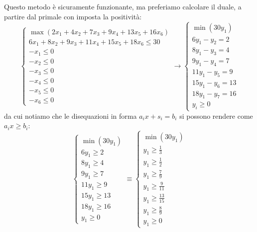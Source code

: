 \documentclass[a4paper,11pt]{article}
\begin{document}
Questo metodo è sicuramente funzionante, ma preferiamo calcolare il duale, a partire dal primale con imposta la positività:
\[
	\begin{cases}
		\max \left( 2x_1 + 4x_2 + 7x_3 + 9x_4 + 13x_5 + 16x_6 \right) \\ 
		6x_1 + 8x_2 + 9x_3 + 11x_4 + 15x_5 + 18x_6 \leq 30 \\
		-x_1 \leq 0 \\ 
		-x_2 \leq 0 \\ 
		-x_3 \leq 0 \\ 
		-x_4 \leq 0 \\ 
		-x_5 \leq 0 \\ 
		-x_6 \leq 0
	\end{cases}
	\rightarrow 
	\begin{cases}
		\min \left( 30y_1 \right) \\ 
		6 y_1 - y_2 = 2 \\
		8 y_1 - y_3 = 4 \\ 
		9 y_1 - y_4 = 7 \\ 
		11 y_1 - y_5 = 9 \\ 
		15 y_1 - y_6 = 13 \\ 
		18 y_1 - y_7 = 16 \\ 
		y_i \geq 0
	\end{cases}
\]
da cui notiamo che le disequazioni in forma $a_i x + s_i = b_i$ si possono rendere come $a_i x \geq b_i$: 
\[
	\begin{cases}
		\min \left( 30y_1 \right) \\ 
		6 y_1 \geq 2 \\
		8 y_1 \geq 4 \\ 
		9 y_1 \geq 7 \\ 
		11 y_1 \geq 9 \\ 
		15 y_1 \geq 13 \\ 
		18 y_1 \geq 16 \\ 
		y_1 \geq 0
	\end{cases} \equiv
	\begin{cases}
		\min \left( 30y_1 \right) \\ 
		y_1 \geq \frac{1}{3} \\
		y_1 \geq \frac{1}{2} \\ 
		y_1 \geq \frac{7}{9} \\ 
		y_1 \geq \frac{9}{11} \\ 
		y_1 \geq \frac{13}{15} \\ 
		y_1 \geq \frac{8}{9} \\ 
		y_1 \geq 0
	\end{cases}
\]
\end{document}
